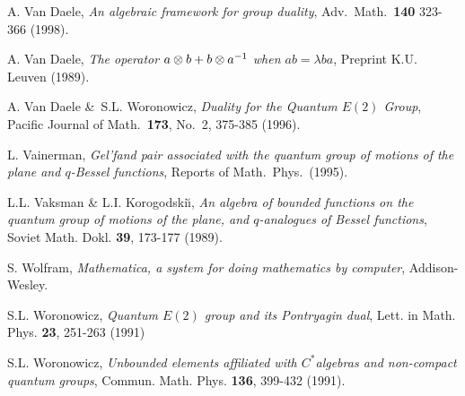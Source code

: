 \begin{thebibliography}{99}
 {\sc A. Van Daele},
   {\em An algebraic framework for group duality\/},
   Adv.\ Math.\ {\bf 140} 323-366 (1998).

 {\sc A. Van Daele},
   {\em The operator $a \otimes b + b \otimes a^{-1}$ when $ab=\lambda ba$\/},
   Preprint K.U. Leuven (1989).

 {\sc A. Van Daele \&\ S.L. Woronowicz},
   {\em Duality for the Quantum $E(2)$ Group\/},
   Pacific Journal of Math.\ {\bf 173}, No.\ 2, 375-385 (1996).

 {\sc L. Vainerman},
    {\em Gel'fand pair associated with the quantum group of motions
         of the plane and $q$-Bessel functions\/},
         Reports of Math.\ Phys.\ (1995).

 {\sc L.L. Vaksman \& L.I.
         Korogodski\u{\i}},
         {\em An algebra of bounded functions on the quantum group of motions
              of the plane, and $q$-analogues of Bessel functions\/},
         Soviet Math. Dokl. {\bf 39}, 173-177 (1989).

 {\sc S. Wolfram},
  {\em Mathematica, a system for doing mathematics by computer\/},
  Addison-Wesley.

 {\sc S.L. Woronowicz},
   {\em Quantum $E(2)$ group and its Pontryagin dual\/},
   Lett. in Math. Phys. {\bf 23}, 251-263 (1991)

 {\sc S.L. Woronowicz},
   {\em  Unbounded elements affiliated with $C^*$algebras
         and non-compact quantum groups\/},
         Commun. Math. Phys. {\bf 136}, 399-432 (1991).

\end{thebibliography}



